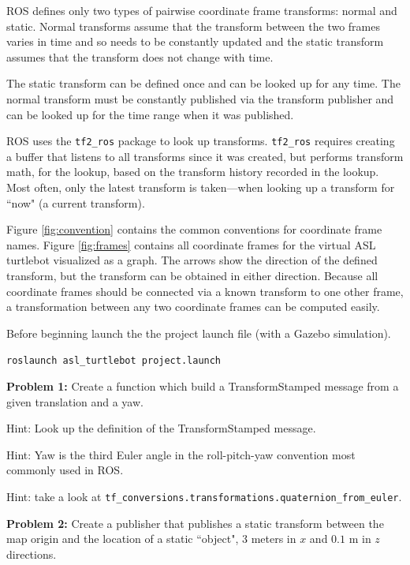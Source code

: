 \documentclass{article}
\begin{document}
ROS defines only two types of pairwise coordinate frame transforms: normal and static. Normal transforms assume that the transform between the two frames varies in time and so needs to be constantly updated and the static transform assumes that the transform does not change with time. 

\begin{tcolorbox}[title=ROS Transforms Takeaways]
The static transform can be defined once and can be looked up for any time. The normal transform must be constantly published via the transform publisher and can be looked up for the time range when it was published.

ROS uses the \texttt{tf2\_ros} package to look up transforms. \texttt{tf2\_ros} requires creating a buffer that listens to all transforms since it was created, but performs transform math, for the lookup, based on the transform history recorded in the lookup. Most often, only the latest transform is taken---when looking up a transform for ``now" (a current transform).
\end{tcolorbox}

Figure \ref{fig:convention} contains the common conventions for coordinate frame names. Figure \ref{fig:frames} contains all coordinate frames for the virtual ASL turtlebot visualized as a graph. The arrows show the direction of the defined transform, but the transform can be obtained in either direction. Because all coordinate frames should be connected via a known transform to one other frame, a transformation between any two coordinate frames can be computed easily.

\newpage

Before beginning launch the the project launch file (with a Gazebo simulation).

\texttt{roslaunch asl\_turtlebot project.launch}

\textbf{Problem 1:} Create a function which build a TransformStamped message from a given translation and a yaw.

Hint: Look up the definition of the TransformStamped message.

Hint: Yaw is the third Euler angle in the roll-pitch-yaw convention most commonly used in ROS.

Hint: take a look at \texttt{tf\_conversions.transformations.quaternion\_from\_euler}.

\textbf{Problem 2:} Create a publisher that publishes a static transform between the map origin and the location of a static ``object", 3 meters in $x$ and $0.1$ m in $z$ directions.
\end{document}

